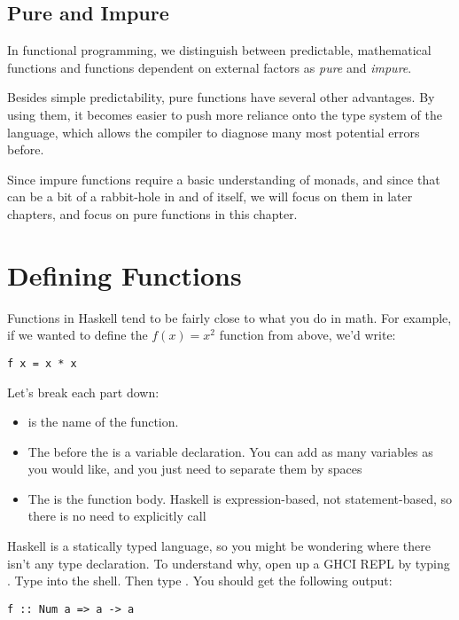 \subsection{Pure and Impure} 
In functional programming, we distinguish between predictable, mathematical functions and functions dependent on external factors as \textit{pure} and \textit{impure}.  

Besides simple predictability, pure functions have several other advantages.  By using them, it becomes easier to push more reliance onto the type system of the language, which allows the compiler to diagnose many most potential errors before. 

Since impure functions require a basic understanding of monads, and since that can be a bit of a rabbit-hole in and of itself, we will focus on them in later chapters, and focus on pure functions in this chapter. 
\section {Defining Functions}

Functions in Haskell tend to be fairly close to what you do in math. For example, if we wanted to define the $ f\left( x \right) = x ^ 2 $ function from above, we'd write: 

\begin{verbatim}
f x = x * x
\end{verbatim}

Let's break each part down: 

\begin{itemize}
\item {} is the name of the function.  
\item The  before the \inlinecode{=} is a variable declaration. You can add as many variables as you would like, and you just need to separate them by spaces
\item The  is the function body. Haskell is expression-based, not statement-based, so there is no need to explicitly call 
\end {itemize}

Haskell is a statically typed language, so you might be wondering where there isn't any type declaration.  
To understand why, open up a GHCI REPL by typing . Type  into the shell. Then type . You should get the following output:

\begin{verbatim}
f :: Num a => a -> a
\end{verbatim}

